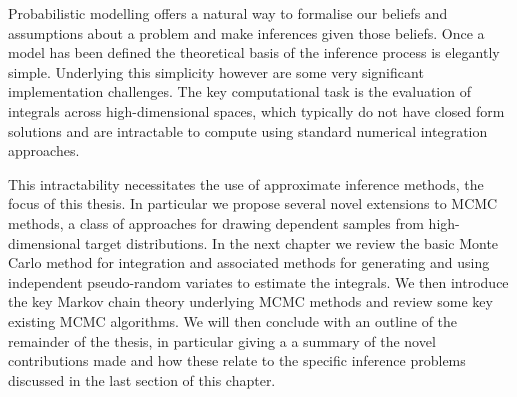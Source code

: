 Probabilistic modelling offers a natural way to formalise our beliefs and assumptions about a problem and make inferences given those beliefs. Once a model has been defined the theoretical basis of the inference process is elegantly simple. Underlying this simplicity however are some very significant implementation challenges. The key computational task is the evaluation of integrals across high-dimensional spaces, which typically do not have closed form solutions and are intractable to compute using standard numerical integration approaches. 

This intractability necessitates the use of approximate inference methods, the focus of this thesis.  In particular we propose several novel extensions to \ac{MCMC} methods, a class of approaches for drawing dependent samples from high-dimensional target distributions. In the next chapter we review the basic Monte Carlo method for integration and associated methods for generating and using independent pseudo-random variates to estimate the integrals. We then introduce the key Markov chain theory underlying \ac{MCMC} methods and review some key existing \ac{MCMC} algorithms. We will then conclude with an outline of the remainder of the thesis, in particular giving a a summary of the novel contributions made and how these relate to the specific inference problems discussed in the last section of this chapter.





